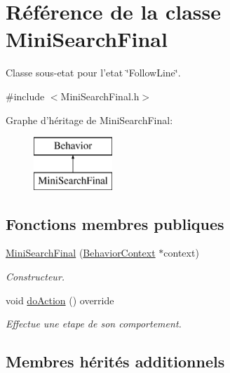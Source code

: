 \hypertarget{class_mini_search_final}{\section{Référence de la classe Mini\-Search\-Final}
\label{class_mini_search_final}
}


Classe sous-\/etat pour l'etat \char`\"{}\-Follow\-Line\char`\"{}.  




{\ttfamily \#include $<$Mini\-Search\-Final.\-h$>$}

Graphe d'héritage de Mini\-Search\-Final\-:\begin{figure}[H]
\begin{center}
\leavevmode
\includegraphics[height=2.000000cm]{class_mini_search_final}
\end{center}
\end{figure}
\subsection*{Fonctions membres publiques}
{\bf }\par
\begin{DoxyCompactItemize}
\item 
\hyperlink{class_mini_search_final_a8a16bd8a9e71bfefa9ffac6e5ca84505}{Mini\-Search\-Final} (\hyperlink{class_behavior_context}{Behavior\-Context} $\ast$context)
\begin{DoxyCompactList}\small\item\em Constructeur. \end{DoxyCompactList}\item 
void \hyperlink{class_mini_search_final_a1337f80dce8ad765072666fb9bcae9bc}{do\-Action} () override
\begin{DoxyCompactList}\small\item\em Effectue une etape de son comportement. \end{DoxyCompactList}\end{DoxyCompactItemize}

\subsection*{Membres hérités additionnels}


